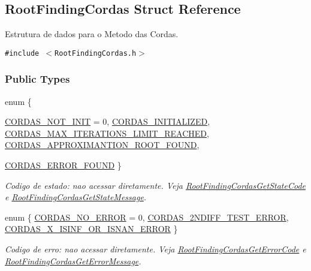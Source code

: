 \hypertarget{structRootFindingCordas}{
\subsection{RootFindingCordas Struct Reference}
\label{structRootFindingCordas}
}
Estrutura de dados para o Metodo das Cordas.  


{\tt \#include $<$RootFindingCordas.h$>$}

\subsubsection*{Public Types}
\begin{CompactItemize}
\item 
enum \{ \par
\hyperlink{structRootFindingCordas_9720f2b18833ec99c78c5d1fc2e675b18c54532f66ed8582432a3ac138983a92}{CORDAS\_\-NOT\_\-INIT} =  0, 
\hyperlink{structRootFindingCordas_9720f2b18833ec99c78c5d1fc2e675b1354fe30a9952fd05ac392afb7e13c3d0}{CORDAS\_\-INITIALIZED}, 
\hyperlink{structRootFindingCordas_9720f2b18833ec99c78c5d1fc2e675b161cf70c0991908a217b308e24a87e14d}{CORDAS\_\-MAX\_\-ITERATIONS\_\-LIMIT\_\-REACHED}, 
\hyperlink{structRootFindingCordas_9720f2b18833ec99c78c5d1fc2e675b1753f6f226e66a88d3b6413815c679752}{CORDAS\_\-APPROXIMANTION\_\-ROOT\_\-FOUND}, 
\par
\hyperlink{structRootFindingCordas_9720f2b18833ec99c78c5d1fc2e675b109d02da81d1e39d383d6e26a97c4c3b6}{CORDAS\_\-ERROR\_\-FOUND}
 \}
\begin{CompactList}\small\item\em Codigo de estado: nao acessar diretamente. Veja \hyperlink{group____cordas_g67aaf428f922e7d15a7fbd5a4508ffd7}{RootFindingCordasGetStateCode} e \hyperlink{group____cordas_ga065f13f2ec77b2e949190c1aca9ef9d}{RootFindingCordasGetStateMessage}. \item\end{CompactList}\item 
enum \{ \hyperlink{structRootFindingCordas_d8ce691fb5c074038507880fdc6671813fa9461c017fe10d1f23204342e55084}{CORDAS\_\-NO\_\-ERROR} =  0, 
\hyperlink{structRootFindingCordas_d8ce691fb5c074038507880fdc6671816e75094d3e9cb381b6d45aaeb579453c}{CORDAS\_\-2NDIFF\_\-TEST\_\-ERROR}, 
\hyperlink{structRootFindingCordas_d8ce691fb5c074038507880fdc6671810e6bdbf35dd606ee214c808ddc9f4c50}{CORDAS\_\-X\_\-ISINF\_\-OR\_\-ISNAN\_\-ERROR}
 \}
\begin{CompactList}\small\item\em Codigo de erro: nao acessar diretamente. Veja \hyperlink{group____cordas_gcc4b8454f6664e389c484498f42c17d8}{RootFindingCordasGetErrorCode} e \hyperlink{group____cordas_g5a6750a998093e1701c8a01ae24e9cc2}{RootFindingCordasGetErrorMessage}. \item\end{CompactList}\end{CompactItemize}
